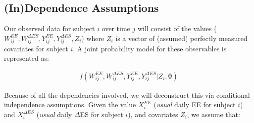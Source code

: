 \documentclass[11pt]{article}\usepackage[]{graphicx}\usepackage[]{color}
\begin{document}

%  

\subsection{(In)Dependence Assumptions}

 Our observed data for subject $i$ over time $j$ will consist of the values ({\bf$W_{ij}^{EE},W_{ij}^{\Delta ES}, Y_{ij}^{EE},Y_{ij}^{\Delta ES}, Z_i$}) where $Z_i$ is a vector of (assumed) perfectly measured covariates for subject $i$. A joint probability model for these observables is represented as:

\begin{align}
  f(W_{ij}^{EE},W_{ij}^{\Delta ES}, Y_{ij}^{EE},Y_{ij}^{\Delta ES}|Z_i,\boldsymbol{\theta})
  \label{fullmodel}
\end{align}

Because of all the dependencies involved, we will deconstruct this via conditional independence assumptions. Given the value $X_i^{EE}$ (\emph{usual} daily EE for subject $i$) and $X_i^{\Delta ES}$ (\emph{usual} daily $\Delta$ES for subject $i$), and covariates $Z_i$, we assume that:
\end{document}
